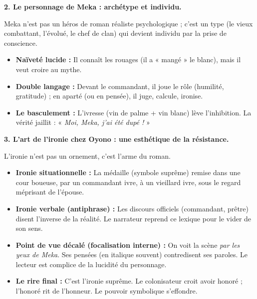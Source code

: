 \documentclass[11pt]{article}
\newcommand{\cle}[1]{{\popxbold\color{popdark}#1}}
\begin{document}
\textbf{2. Le personnage de Meka : archétype et individu.}\par
Meka n'est pas un héros de roman réaliste psychologique ; c'est un \cle{type} (le vieux combattant, l'évolué, le chef de clan) qui devient \cle{individu} par la prise de conscience.
\begin{itemize}
    \item \textbf{Naïveté lucide :} Il connaît les rouages (il a « mangé » le blanc), mais il veut croire au mythe.
    \item \textbf{Double langage :} Devant le commandant, il joue le rôle (humilité, gratitude) ; en aparté (ou en pensée), il juge, calcule, ironise.
    \item \textbf{Le basculement :} L'ivresse (vin de palme + vin blanc) lève l'inhibition. La vérité jaillit : « \emph{Moi, Meka, j'ai été dupé !} »
\end{itemize}

\textbf{3. L'art de l'ironie chez Oyono : une esthétique de la résistance.}\par
L'ironie n'est pas un ornement, c'est l'\cle{arme} du roman.
\begin{itemize}
    \item \textbf{Ironie situationnelle :} La médaille (symbole suprême) remise dans une cour boueuse, par un commandant ivre, à un vieillard ivre, sous le regard méprisant de l'épouse.
    \item \textbf{Ironie verbale (antiphrase) :} Les discours officiels (commandant, prêtre) disent l'inverse de la réalité. Le narrateur reprend ce lexique pour le vider de son sens.
    \item \textbf{Point de vue décalé (focalisation interne) :} On voit la scène \emph{par les yeux de Meka}. Ses pensées (en italique souvent) contredisent ses paroles. Le lecteur est complice de la lucidité du personnage.
    \item \textbf{Le rire final :} C'est l'ironie suprême. Le colonisateur croit avoir honoré ; l'honoré rit de l'honneur. Le pouvoir symbolique s'effondre.
\end{itemize}
\end{document}
